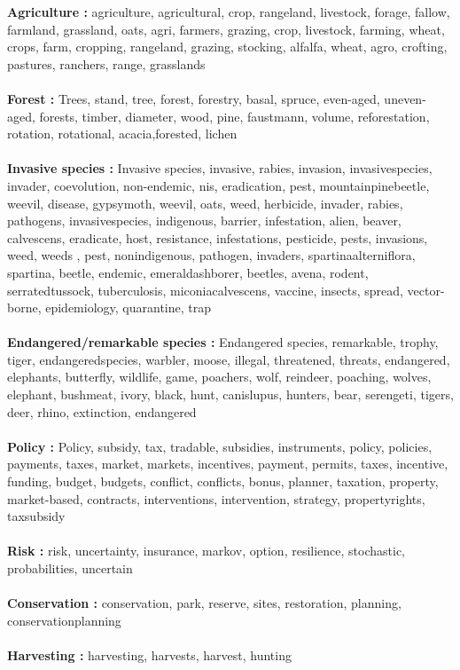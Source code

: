 \textbf{Agriculture : }  agriculture, agricultural, crop, rangeland, livestock, forage, fallow, farmland, grassland, oats, agri, farmers, grazing, crop, livestock, farming, wheat, crops, farm, cropping, rangeland, grazing, stocking, alfalfa, wheat, agro, crofting, pastures, ranchers, range,  grasslands 
\\\\
\textbf{Forest :} Trees, stand, tree, forest, forestry,  basal, spruce, 
even-aged, uneven-aged,  forests, timber, diameter, wood, pine, faustmann,
volume, reforestation, rotation, rotational, acacia,forested, lichen
\\\\
\textbf{Invasive species :} 
 Invasive species,  invasive,  rabies,  invasion,  invasivespecies,  invader,  coevolution, non-endemic,  nis,  eradication,  pest,  mountainpinebeetle,  weevil, disease, gypsymoth, weevil, oats,  weed, herbicide,  invader,  rabies, pathogens,  invasivespecies, indigenous,  barrier,  infestation,  alien,  beaver, calvescens,  eradicate, host, resistance, infestations,  pesticide, pests,  invasions, weed, weeds ,  pest, nonindigenous, pathogen,  invaders,  spartinaalterniflora,  spartina, beetle, endemic, emeraldashborer, beetles, avena, rodent, serratedtussock, tuberculosis, miconiacalvescens, vaccine, insects, spread, vector-borne, epidemiology, quarantine, trap 
 \\\\
 \textbf{Endangered/remarkable species : }Endangered species, remarkable, trophy, tiger, endangeredspecies, warbler, moose, illegal, threatened, threats, endangered, elephants, butterfly, wildlife, game, poachers, wolf, reindeer, poaching, wolves, elephant, bushmeat, ivory, black, hunt, canislupus, hunters, bear, serengeti, tigers, deer, rhino, extinction, endangered 
 \\\\
 \textbf{Policy : }
 Policy, subsidy, tax, tradable, subsidies, instruments, policy, policies, payments, taxes, market, markets, incentives, payment, permits, taxes, incentive, funding, budget, budgets, conflict, conflicts, bonus, planner, taxation, property, market-based, contracts, interventions, intervention, strategy, propertyrights, taxsubsidy
 \\\\
 \textbf{Risk : }risk, uncertainty, insurance, markov, option, resilience, stochastic, probabilities, uncertain
 \\\\
 \textbf{Conservation : }
 conservation, park, reserve, sites, restoration, planning, conservationplanning
 \\\\
 \textbf{Harvesting : }harvesting, harvests, harvest, hunting

